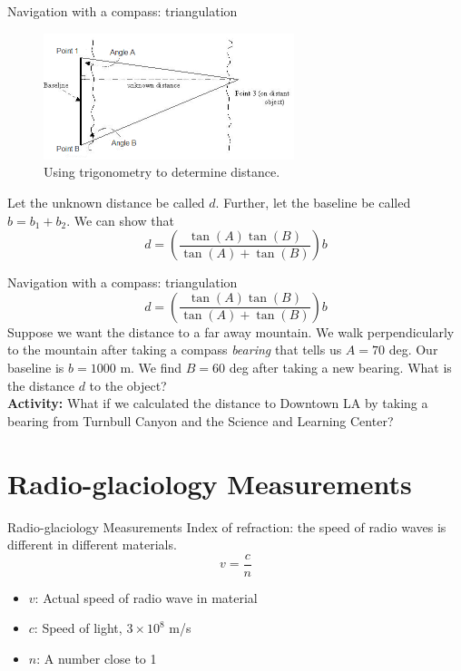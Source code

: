 \documentclass{beamer}
\begin{document}
\begin{frame}{Navigation with a compass: triangulation}
\begin{figure}
\centering
\includegraphics[width=0.65\textwidth]{triangle.png}
\caption{\label{fig:compass2} Using trigonometry to determine distance.}
\end{figure}
Let the unknown distance be called $d$.  Further, let the baseline be called $b = b_1 + b_2$.  We can show that
\begin{equation}
\boxed{
d = \left(\frac{\tan(A)\tan(B)}{\tan(A) + \tan(B)}\right)b}
\end{equation}
\end{frame}

\begin{frame}{Navigation with a compass: triangulation}
\small
\begin{equation}
\boxed{
d = \left(\frac{\tan(A)\tan(B)}{\tan(A) + \tan(B)}\right)b}
\end{equation}
Suppose we want the distance to a far away mountain.  We walk perpendicularly to the mountain after taking a compass \textit{bearing} that tells us $A = 70$ deg.  Our baseline is $b = 1000$ m.  We find $B = 60$ deg after taking a new bearing.  What is the distance $d$ to the object? \\ \vspace{1cm}
\textbf{Activity:}  What if we calculated the distance to Downtown LA by taking a bearing from Turnbull Canyon and the Science and Learning Center?
\end{frame}

\section{Radio-glaciology Measurements}

\begin{frame}{Radio-glaciology Measurements}
Index of refraction: the speed of radio waves is different in different materials.
\begin{equation}
v = \frac{c}{n}
\end{equation}
\begin{itemize}
\item $v$: Actual speed of radio wave in material
\item $c$: Speed of light, $3 \times 10^{8}$ m/s
\item $n$: A number close to 1
\end{itemize}
\end{frame}
\end{document}
